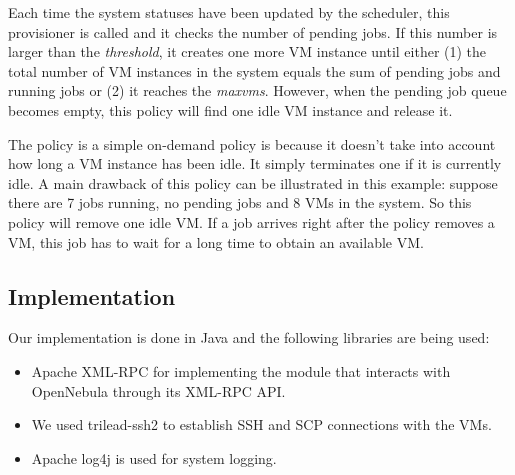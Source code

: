 Each time the system statuses have been updated by the scheduler, this
provisioner is called and it checks the number of pending jobs. If
this number is larger than the \emph{threshold}, it creates one more
VM instance until either (1) the total number of VM instances in the
system equals the sum of pending jobs and running jobs or (2) it reaches
the \emph{maxvms}. However, when the pending job queue becomes empty,
this policy will find one idle VM instance and release it.

The \policysimpleelastic{} policy is a simple on-demand policy is because
it doesn't take into account how long a VM instance has been idle. It simply
terminates one if it is currently idle. A main drawback of this policy
can be illustrated in this example: suppose there are 7 jobs running,
no pending jobs and 8 VMs in the system. So this policy will remove
one idle VM. If a job arrives right after the policy removes a VM,
this job has to wait for a long time to obtain an available VM.

\subsection{Implementation}
Our implementation is done in Java and the following libraries are
being used:

\begin{itemize}
\item Apache XML-RPC\cite{URL:ApacheXmlRpc} for implementing the module
  that interacts with OpenNebula through its XML-RPC API.
\item We used trilead-ssh2\cite{URL:trilead-ssh2} to establish SSH
  and SCP connections with the VMs.
\item Apache log4j\cite{URL:ApacheLog4j} is used for system logging.
\end{itemize}
